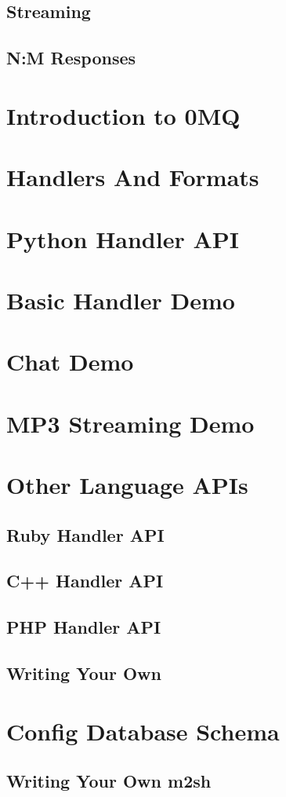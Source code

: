 \subsection{Streaming}


\subsection{N:M Responses}



\section{Introduction to 0MQ}


\section{Handlers And Formats}


\section{Python Handler API}


\section{Basic Handler Demo}


\section{Chat Demo}


\section{MP3 Streaming Demo}


\section{Other Language APIs}


\subsection{Ruby Handler API}


\subsection{C++ Handler API}


\subsection{PHP Handler API}


\subsection{Writing Your Own}


\section{Config Database Schema}


\subsection{Writing Your Own m2sh}



